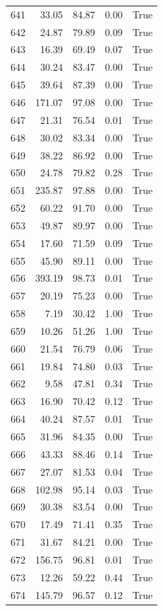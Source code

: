 \begin{longtable}{rrrrr}
641 & 33.05 & 84.87 & 0.00 & True \\
642 & 24.87 & 79.89 & 0.09 & True \\
643 & 16.39 & 69.49 & 0.07 & True \\
644 & 30.24 & 83.47 & 0.00 & True \\
645 & 39.64 & 87.39 & 0.00 & True \\
646 & 171.07 & 97.08 & 0.00 & True \\
647 & 21.31 & 76.54 & 0.01 & True \\
648 & 30.02 & 83.34 & 0.00 & True \\
649 & 38.22 & 86.92 & 0.00 & True \\
650 & 24.78 & 79.82 & 0.28 & True \\
651 & 235.87 & 97.88 & 0.00 & True \\
652 & 60.22 & 91.70 & 0.00 & True \\
653 & 49.87 & 89.97 & 0.00 & True \\
654 & 17.60 & 71.59 & 0.09 & True \\
655 & 45.90 & 89.11 & 0.00 & True \\
656 & 393.19 & 98.73 & 0.01 & True \\
657 & 20.19 & 75.23 & 0.00 & True \\
658 & 7.19 & 30.42 & 1.00 & True \\
659 & 10.26 & 51.26 & 1.00 & True \\
660 & 21.54 & 76.79 & 0.06 & True \\
661 & 19.84 & 74.80 & 0.03 & True \\
662 & 9.58 & 47.81 & 0.34 & True \\
663 & 16.90 & 70.42 & 0.12 & True \\
664 & 40.24 & 87.57 & 0.01 & True \\
665 & 31.96 & 84.35 & 0.00 & True \\
666 & 43.33 & 88.46 & 0.14 & True \\
667 & 27.07 & 81.53 & 0.04 & True \\
668 & 102.98 & 95.14 & 0.03 & True \\
669 & 30.38 & 83.54 & 0.00 & True \\
670 & 17.49 & 71.41 & 0.35 & True \\
671 & 31.67 & 84.21 & 0.00 & True \\
672 & 156.75 & 96.81 & 0.01 & True \\
673 & 12.26 & 59.22 & 0.44 & True \\
674 & 145.79 & 96.57 & 0.12 & True \\

\end{longtable}

